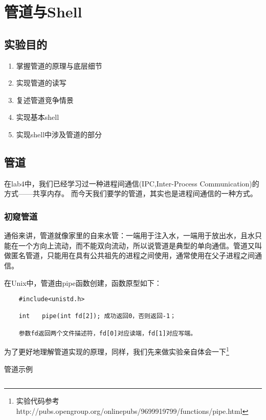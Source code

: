 \chapter{管道与Shell}
\section{实验目的}
\begin{enumerate}
	\item 掌握管道的原理与底层细节
	\item 实现管道的读写
	\item 复述管道竞争情景
	\item 实现基本shell
	\item 实现shell中涉及管道的部分
\end{enumerate}

\section{管道}

在lab4中，我们已经学习过一种进程间通信(IPC,Inter-Process Communication)的方式——共享内存。
而今天我们要学的管道，其实也是进程间通信的一种方式。

\subsection{初窥管道}

通俗来讲，管道就像家里的自来水管：一端用于注入水，一端用于放出水，且水只能在一个方向上流动，而不能双向流动，所以说管道是典型的单向通信。管道又叫做匿名管道，只能用在具有公共祖先的进程之间使用，通常使用在父子进程之间通信。
 
在Unix中，管道由pipe函数创建，函数原型如下：

\begin{verbatim}
	#include<unistd.h>
	
	int　　pipe(int fd[2]); 成功返回0，否则返回-1；
	
	参数fd返回两个文件描述符，fd[0]对应读端，fd[1]对应写端。
\end{verbatim}

为了更好地理解管道实现的原理，同样，我们先来做实验亲自体会一下\footnote{实验代码参考 http://pubs.opengroup.org/onlinepubs/9699919799/functions/pipe.html}

\begin{codeBoxWithCaption}{管道示例\label{code:test_pipe.c}}
	\inputminted[linenos]{c}{codes/test_pipe.c}
\end{codeBoxWithCaption}

